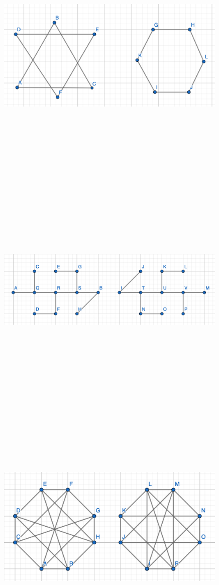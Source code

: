 \documentclass[12pt]{exam}
\begin{document}
\begin{solution} 
    \begin{qparts}
        \item ~\\ \includegraphics[width=30em]{isomorphism 1.png}
        ~\\~\\~\\~\\~\\~\\~\\~\\~\\~\\~\\~\\~\\~\\
        \item ~\\ \includegraphics[width=30em]{isomorphism 4.png}
        ~\\~\\~\\~\\~\\~\\~\\~\\~\\~\\~\\~\\~\\~\\
        \item ~\\ \includegraphics[width=30em]{isomorphism 5.png}

\end{qparts}
\end{solution}
\end{document}
